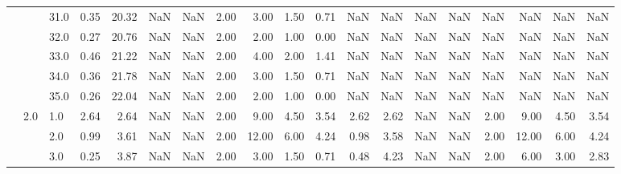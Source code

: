 \begin{tabular}{lllrrrrrrrrrrrrrrrr}
       &     & 31.0 &      0.35 &      20.32 &               NaN &                NaN & 2.00 &   3.00 &             1.50 &                         0.71 &       NaN &        NaN &               NaN &                NaN &  NaN &    NaN &              NaN &                          NaN \\
       &     & 32.0 &      0.27 &      20.76 &               NaN &                NaN & 2.00 &   2.00 &             1.00 &                         0.00 &       NaN &        NaN &               NaN &                NaN &  NaN &    NaN &              NaN &                          NaN \\
       &     & 33.0 &      0.46 &      21.22 &               NaN &                NaN & 2.00 &   4.00 &             2.00 &                         1.41 &       NaN &        NaN &               NaN &                NaN &  NaN &    NaN &              NaN &                          NaN \\
       &     & 34.0 &      0.36 &      21.78 &               NaN &                NaN & 2.00 &   3.00 &             1.50 &                         0.71 &       NaN &        NaN &               NaN &                NaN &  NaN &    NaN &              NaN &                          NaN \\
       &     & 35.0 &      0.26 &      22.04 &               NaN &                NaN & 2.00 &   2.00 &             1.00 &                         0.00 &       NaN &        NaN &               NaN &                NaN &  NaN &    NaN &              NaN &                          NaN \\
       & 2.0 & 1.0  &      2.64 &       2.64 &               NaN &                NaN & 2.00 &   9.00 &             4.50 &                         3.54 &      2.62 &       2.62 &               NaN &                NaN & 2.00 &   9.00 &             4.50 &                         3.54 \\
       &     & 2.0  &      0.99 &       3.61 &               NaN &                NaN & 2.00 &  12.00 &             6.00 &                         4.24 &      0.98 &       3.58 &               NaN &                NaN & 2.00 &  12.00 &             6.00 &                         4.24 \\
       &     & 3.0  &      0.25 &       3.87 &               NaN &                NaN & 2.00 &   3.00 &             1.50 &                         0.71 &      0.48 &       4.23 &               NaN &                NaN & 2.00 &   6.00 &             3.00 &                         2.83 \\

\end{tabular}
